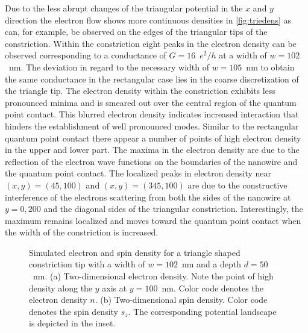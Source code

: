 Due to the less abrupt changes of the triangular potential in the $x$ and $y$ direction the electron flow shows more continuous densities in \cref{fig:triedens} as can, for example, be observed on the edges of the triangular tips of the constriction. Within the constriction eight peaks in the electron density can be observed corresponding to a conductance of $G=16$~$e^2/h$ at a width of $w=102$~nm. The deviation in regard to the necessary width of $w=105$~nm to obtain the same conductance in the rectangular case lies in the coarse discretization of the triangle tip. The electron density within the constriction exhibits less pronounced minima and is smeared out over the central region of the quantum point contact. This blurred electron density indicates increased interaction that hinders the establishment of well pronounced modes. Similar to the rectangular quantum point contact there appear a number of points of high electron density in the upper and lower part. The maxima in the electron density are due to the reflection of the electron wave functions on the boundaries of the nanowire and the quantum point contact. The localized peaks in electron density near $(x,y) = (45,100)$ and $(x,y) = (345,100)$ are due to the constructive interference of the electrons scattering from both the sides of the nanowire at $y=0,200$ and the diagonal sides of the triangular constriction. Interestingly, the maximum remains localized and moves toward the quantum point contact when the width of the constriction is increased.\par
\begin{figure}[h!]
  \hspace{14pt}
  \hspace{4pt}
  \caption{Simulated electron and spin density for a triangle shaped constriction tip with a width of $w=102$~nm and a depth $d=50$~nm. (a) Two-dimensional electron density. Note the point of high density along the $y$ axis at $y=100$~nm. Color code denotes the electron density $n$. (b) Two-dimensional spin density.  Color code denotes the spin density $s_z$. The corresponding potential landscape is depicted in the inset.}
\end{figure}
